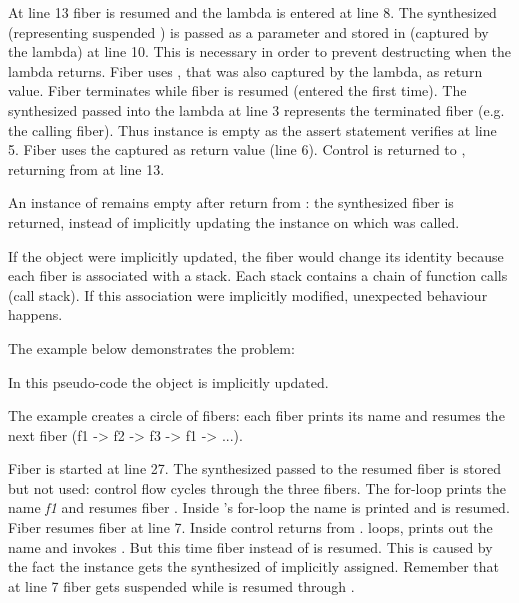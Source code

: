 At line 13 fiber  is resumed and the lambda is entered at line 8. The
synthesized \fiber\xspace {} (representing suspended \main) is passed as a
parameter  and stored in  (captured by the lambda) at line 10.
This is necessary in order to prevent destructing  when the lambda
returns. Fiber  uses , that was also captured by the lambda, as
return value. Fiber  terminates while fiber  is resumed (entered
the first time). The synthesized \fiber\xspace {} passed into the lambda at line 3
represents the terminated fiber  (e.g. the calling fiber). Thus instance
 is empty as the assert statement verifies at line 5. Fiber  uses
the captured \fiber\xspace {} as return value (line 6). Control is returned to
\main, returning from  at line 13.


\label{fiberreturn}
An instance of \fiber remains empty after return from \anyresume: the
synthesized fiber is returned, instead of implicitly updating the \fiber
instance on which \resume was called.

If the \fiber object were implicitly updated, the fiber would 
change its identity because each fiber is associated with a stack. Each stack
contains a chain of function calls (call stack). If this association were
implicitly modified, unexpected behaviour happens.

The example below demonstrates the problem:

In this pseudo-code the \fiber object is implicitly updated.

The example creates a circle of fibers: each fiber prints its name and resumes
the next fiber (f1 -> f2 -> f3 -> f1 -> ...).

Fiber  is started at line 27. The synthesized \fiber\xspace {} passed 
to the resumed fiber is stored but not used: control flow cycles through the three
fibers.
The for-loop prints the name \emph{f1} and resumes fiber . Inside 
's for-loop the name is printed and  is resumed. Fiber 
resumes fiber  at line 7. Inside  control returns from
.  loops, prints out the name and invokes . But
this time fiber  instead of  is resumed. This is caused by the
fact the instance  gets the synthesized \fiber of  implicitly
assigned. Remember that at line 7 fiber  gets suspended while 
is resumed through .

